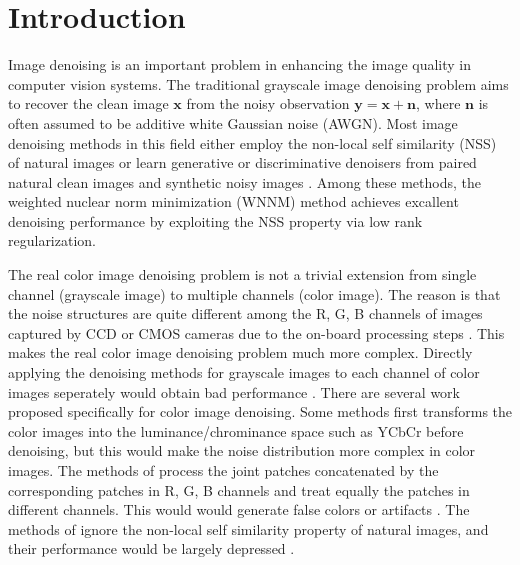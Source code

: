 \documentclass[10pt,twocolumn,letterpaper,sort&compress]{article}
\begin{document}
\section{Introduction}
Image denoising is an important problem in enhancing the image quality in computer vision systems. The traditional grayscale image denoising problem aims to recover the clean image $\mathbf{x}$ from the noisy observation $\mathbf{y}=\mathbf{x}+\mathbf{n}$, where $\mathbf{n}$ is often assumed to be additive white Gaussian noise (AWGN). Most image denoising methods in this field either employ the non-local self similarity (NSS) of natural images \cite{nlm,bm3d,ksvd,lssc,ncsr,pgpd,wnnm} or learn generative or discriminative denoisers from paired natural clean images and synthetic noisy images \cite{foe,epll,mlp,csf,chen2015learning}. Among these methods, the weighted nuclear norm minimization (WNNM) method achieves excallent denoising performance by exploiting the NSS property via low rank regularization. 

The real color image denoising problem is not a trivial extension from single channel (grayscale image) to multiple channels (color image). The reason is that the noise structures are quite different among the R, G, B channels of images captured by CCD or CMOS cameras due to the on-board processing steps \cite{karaimer_brown_ECCV_2016}. This makes the real color image denoising problem much more complex. Directly applying the denoising methods for grayscale images to each channel of color images seperately would obtain bad performance \cite{mairal2008sparse}. There are several work  \cite{foe,cbm3d,mairal2008sparse,Liu2008,noiseclinic,crosschannel2016,Zhu_2016_CVPR} proposed specifically for color image denoising. Some methods \cite{foe,cbm3d} first transforms the color images into the luminance/chrominance space such as YCbCr before denoising, but this would make the noise distribution more complex in color images. The methods of \cite{mairal2008sparse,Zhu_2016_CVPR} process the joint patches concatenated by the corresponding patches in R, G, B channels and treat equally the patches in different channels. This would would generate false colors or artifacts \cite{mairal2008sparse}. The methods of \cite{Liu2008,noiseclinic,crosschannel2016} ignore the non-local self similarity property of natural images, and their performance would be largely depressed \cite{bm3d,wnnm}.
\end{document}
